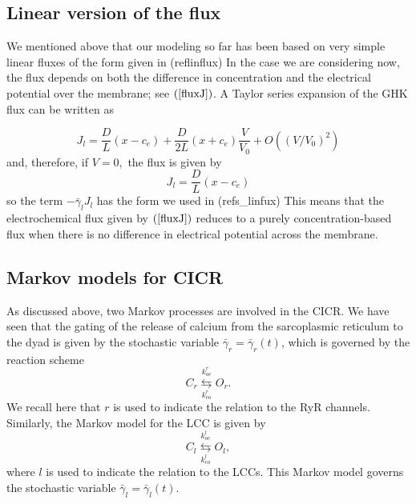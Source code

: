 \subsection{Linear version of the flux}

We mentioned above that our modeling so far has been based on very simple
linear fluxes of the form given in (ref{linflux}) In the
case we are considering now, the flux depends on both the difference in
concentration and the electrical potential over the membrane; see $\left(
\ref{fluxJ}\right)$.  A Taylor series expansion of the GHK flux can be written as

\begin{equation}
J_{l}=\allowbreak\frac{D}{L}\left(  x-c_{e}\right)  +\frac{D}{2L}\left(
x+c_{e}\right)  \frac{V}{V_0} +O\left( \left( V\slash V_0\right)^{2}\right) \label{l_flux}
\end{equation}
and, therefore, if $V=0,$ the flux is given by
\[
J_{l}=\frac{D}{L}\left(
x-c_{e}\right)
\]
so the term $-\bar{\gamma}_{l}J_{l} $ has the form we used
in (ref{s_linfux}) This means that the electrochemical flux given by $\left(
\ref{fluxJ}\right)$ reduces to a purely concentration-based flux
 when there is no difference in electrical potential across the membrane.


\subsection{Markov models for CICR}

As discussed above, two Markov processes are involved in the CICR. We have seen that the gating of the release of
calcium from the sarcoplasmic reticulum to the dyad is given by the stochastic variable
$\bar{\gamma}_{r}=\bar{\gamma}_{r}(t)$, which is governed by the reaction
scheme
\begin{equation}
C_{r}\underset{k_{co}^{r}}{\overset{k_{oc}^{r}}{\leftrightarrows}}O_{r}.
\label{m_r}
\end{equation}
We recall here that $r$ is used to indicate the relation to the RyR
channels. Similarly, the Markov model for the LCC is given by
\begin{equation}
C_{l}\underset{k_{co}^{l}}{\overset{k_{oc}^{l}}{\leftrightarrows}}O_{l},
\label{m_l}
\end{equation}
where $l$ is used to indicate the relation to the LCCs.
This Markov model governs the stochastic variable $\bar{\gamma}_{l}
=\bar{\gamma}_{l}(t).$

